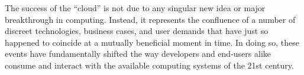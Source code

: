 The success of the ``cloud'' is not due to any singular new idea or
major breakthrough in computing. Instead, it represents the confluence
of a number of discreet technologies, business cases, and user demands
that have just so happened to coincide at a mutually beneficial moment
in time. In doing so, these events have fundamentally shifted the way
developers and end-users alike consume and interact with the available
computing systems of the 21st century.

